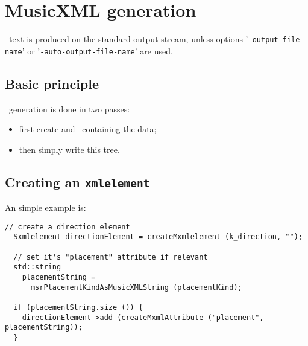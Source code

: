 



\chapter{MusicXML generation}

\mxml\ text is produced on the standard output stream, unless options '{\tt -output-file-name}' or '{\tt -auto-output-file-name}' are used.


\section{Basic principle} \label{musicxmlGeneration}

\mxml\ generation is done in two passes:
\begin{itemize}
\item first create and \mxsrRepr\ containing the data;
\item then simply write this tree.
\end{itemize}


\section{Creating an {\tt xmlelement}}

An simple example is:
\begin{lstlisting}[language=CPlusPlus]
  // create a direction element
  Sxmlelement directionElement = createMxmlelement (k_direction, "");

  // set it's "placement" attribute if relevant
  std::string
    placementString =
      msrPlacementKindAsMusicXMLString (placementKind);

  if (placementString.size ()) {
    directionElement->add (createMxmlAttribute ("placement",  placementString));
  }
\end{lstlisting}

